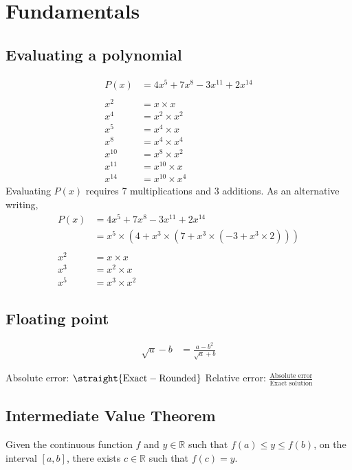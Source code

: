 \documentclass[12pt]{article}
\begin{document}
\section*{Fundamentals}

\subsection*{Evaluating a polynomial}
\begin{align*}
    P(x) &= 4x^5 + 7x^8 - 3x^{11} + 2x^{14} \\
    \\
    x^2 &= x \times x \\
    x^4 &= x^2 \times x^2 \\
    x^5 &= x^4 \times x \\
    x^8 &= x^4 \times x^4 \\
    x^{10} &= x^8 \times x^2 \\
    x^{11} &= x^{10} \times x \\
    x^{14} &= x^{10} \times x^4
\end{align*}
Evaluating $P(x)$ requires 7 multiplications and 3 additions. As an alternative writing,
\begin{align*}
    P(x) &= 4x^5 + 7x^8 - 3x^{11} + 2x^{14} \\
    &= x^5 \times (4 + x^3 \times (7 + x^3 \times (-3 + x^3 \times 2))) \\
    \\
    x^2 &= x \times x \\
    x^3 &= x^2 \times x \\
    x^5 &= x^3 \times x^2
\end{align*}

\subsection*{Floating point}
\begin{align*}
    \sqrt{a} - b &= \frac{a - b^2}{\sqrt{a} + b}
\end{align*}

Absolute error: $\straight{\text{Exact} - \text{Rounded}}$
Relative error: $\frac{\text{Absolute error}}{\text{Exact solution}}$

\subsection*{Intermediate Value Theorem}
Given the continuous function $f$ and $y \in \mathbb{R}$ such that $f(a) \leq y \leq f(b)$, on the interval $[a, b]$, there exists $c \in \mathbb{R}$ such that $f(c) = y$.
\end{document}
